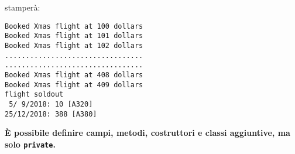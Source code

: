 \documentclass{article}[10pt]
\begin{document}
\noindent
stamper\`a:
{\scriptsize\begin{verbatim}
Booked Xmas flight at 100 dollars
Booked Xmas flight at 101 dollars
Booked Xmas flight at 102 dollars
.................................
.................................
Booked Xmas flight at 408 dollars
Booked Xmas flight at 409 dollars
flight soldout
 5/ 9/2018: 10 [A320]
25/12/2018: 388 [A380]
\end{verbatim}}

\begin{center}
\textbf{\`E possibile definire campi, metodi, costruttori e classi aggiuntive, ma solo \texttt{private}.}
\end{center}
\end{document}

